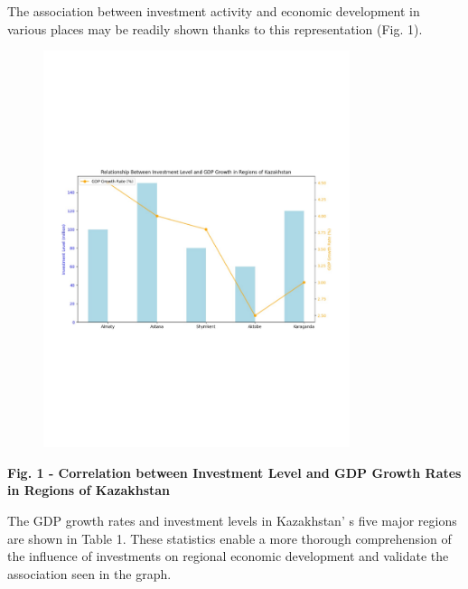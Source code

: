The association between investment activity and economic development in
various places may be readily shown thanks to this representation (Fig.
1).

\begin{figure}[H]
	\centering
	\includegraphics[width=0.8\textwidth]{media/ekon2/image3}
	\caption*{}
\end{figure}


{\bfseries Fig. 1 - Correlation between Investment Level and GDP Growth
Rates in Regions of Kazakhstan}

The GDP growth rates and investment levels in
Kazakhstan' s five major regions are shown in Table 1.
These statistics enable a more thorough comprehension of the influence
of investments on regional economic development and validate the
association seen in the graph.

